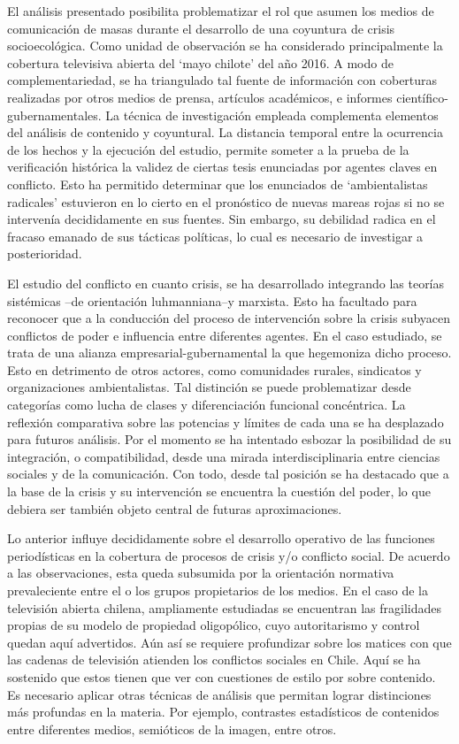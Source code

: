\documentclass{textolivre}
\begin{document}
El análisis presentado posibilita problematizar el rol que asumen los medios de
comunicación de masas durante el desarrollo de una coyuntura de crisis socioecológica.
Como unidad de observación se ha considerado principalmente la cobertura televisiva
abierta del ‘mayo chilote’ del año 2016. A modo de complementariedad, se ha triangulado
tal fuente de información con coberturas realizadas por otros medios de prensa, artículos
académicos, e informes científico-gubernamentales. La técnica de investigación empleada
complementa elementos del análisis de contenido y coyuntural. La distancia temporal
entre la ocurrencia de los hechos y la ejecución del estudio, permite someter a la prueba
de la verificación histórica la validez de ciertas tesis enunciadas por agentes claves en
conflicto. Esto ha permitido determinar que los enunciados de ‘ambientalistas radicales’
estuvieron en lo cierto en el pronóstico de nuevas mareas rojas si no se intervenía
decididamente en sus fuentes. Sin embargo, su debilidad radica en el fracaso emanado
de sus tácticas políticas, lo cual es necesario de investigar a posterioridad.

El estudio del conflicto en cuanto crisis, se ha desarrollado integrando las teorías
sistémicas --de orientación luhmanniana--y marxista. Esto ha facultado para reconocer
que a la conducción del proceso de intervención sobre la crisis subyacen conflictos de
poder e influencia entre diferentes agentes. En el caso estudiado, se trata de una alianza
empresarial-gubernamental la que hegemoniza dicho proceso. Esto en detrimento de
otros actores, como comunidades rurales, sindicatos y organizaciones ambientalistas. Tal
distinción se puede problematizar desde categorías como lucha de clases y diferenciación
funcional concéntrica. La reflexión comparativa sobre las potencias y límites de cada una
se ha desplazado para futuros análisis. Por el momento se ha intentado esbozar la
posibilidad de su integración, o compatibilidad, desde una mirada interdisciplinaria entre
ciencias sociales y de la comunicación. Con todo, desde tal posición se ha destacado que
a la base de la crisis y su intervención se encuentra la cuestión del poder, lo que debiera
ser también objeto central de futuras aproximaciones.

Lo anterior influye decididamente sobre el desarrollo operativo de las funciones
periodísticas en la cobertura de procesos de crisis y/o conflicto social. De acuerdo a las
observaciones, esta queda subsumida por la orientación normativa prevaleciente entre el
o los grupos propietarios de los medios. En el caso de la televisión abierta chilena,
ampliamente estudiadas se encuentran las fragilidades propias de su modelo de
propiedad oligopólico, cuyo autoritarismo y control quedan aquí advertidos. Aún así se
requiere profundizar sobre los matices con que las cadenas de televisión atienden los
conflictos sociales en Chile. Aquí se ha sostenido que estos tienen que ver con cuestiones
de estilo por sobre contenido. Es necesario aplicar otras técnicas de análisis que permitan
lograr distinciones más profundas en la materia. Por ejemplo, contrastes estadísticos de
contenidos entre diferentes medios, semióticos de la imagen, entre otros.
\end{document}
